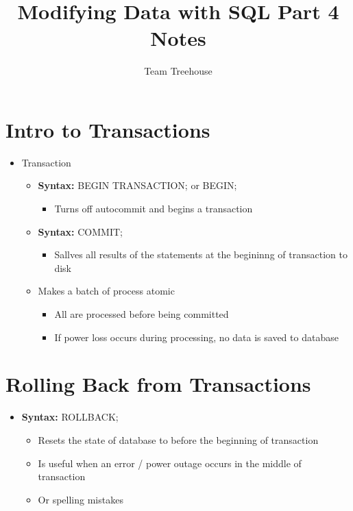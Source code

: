 \documentclass[12pt]{article}
\begin{document}
\title{Modifying Data with SQL Part 4 Notes}
\author{Team Treehouse}
\maketitle

\bigskip

\section{Intro to Transactions}

\bigskip

\begin{itemize}
    \item Transaction
    \begin{itemize}
        \item \textbf{Syntax:} BEGIN TRANSACTION; or BEGIN;
        \begin{itemize}
            \item Turns off autocommit and begins a transaction
        \end{itemize}
        \item \textbf{Syntax:} COMMIT;
        \begin{itemize}
            \item Sallves all results of the statements at the begininng of transaction to disk
        \end{itemize}
        \item Makes a batch of process atomic
        \begin{itemize}
            \item All are processed before being committed
            \item If power loss occurs during processing, no data is saved to database
        \end{itemize}
    \end{itemize}
\end{itemize}

\bigskip

\section{Rolling Back from Transactions}

\bigskip

\begin{itemize}
    \item \textbf{Syntax:} ROLLBACK;
    \begin{itemize}
        \item Resets the state of database to before the beginning of transaction
        \item Is useful when an error / power outage occurs in the middle of transaction
        \item Or spelling mistakes
    \end{itemize}
\end{itemize}
\end{document}
